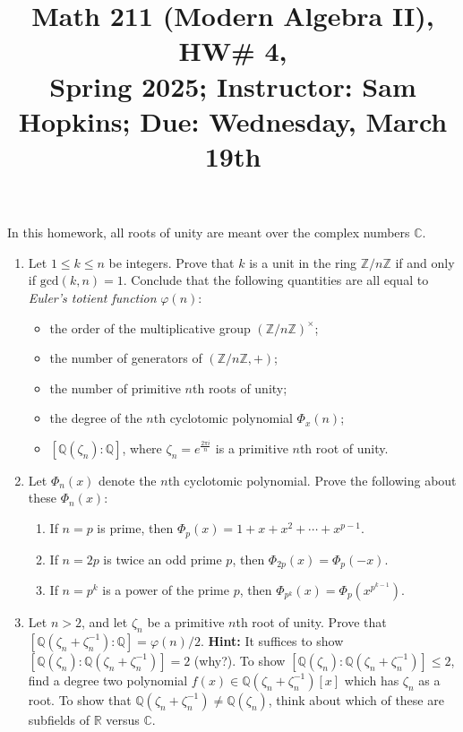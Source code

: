 \documentclass[11pt]{article}
\title{Math 211 (Modern Algebra II), HW\# 4, \\ {\normalsize Spring 2025; Instructor: Sam Hopkins; Due: Wednesday, March 19th}}
\date{}
\begin{document}
\maketitle

\thispagestyle{empty}

In this homework, all roots of unity are meant over the complex numbers $\mathbb{C}$.

\begin{enumerate}

\item Let $1 \leq k \leq n$ be integers. Prove that $k$ is a unit in the ring $\mathbb{Z}/n\mathbb{Z}$ if and only if $\mathrm{gcd}(k,n)=1$. Conclude that the following quantities are all equal to \emph{Euler's totient function} $\varphi(n)$:
\begin{itemize}
\item the order of the multiplicative group $(\mathbb{Z}/n\mathbb{Z})^{\times}$;
\item the number of generators of $(\mathbb{Z}/n\mathbb{Z},+)$;
\item the number of primitive $n$th roots of unity;
\item the degree of the $n$th cyclotomic polynomial $\Phi_x(n)$;
\item $[\mathbb{Q}(\zeta_n)\colon\mathbb{Q}]$, where $\zeta_n=e^{\frac{2\pi i}{n}}$ is a primitive $n$th root of unity.
\end{itemize}

\item Let $\Phi_n(x)$ denote the $n$th cyclotomic polynomial. Prove the following about these $\Phi_n(x)$:
\begin{enumerate}
\item If $n=p$ is prime, then $\Phi_p(x) = 1+x+x^2+\cdots+x^{p-1}$.
\item If $n=2p$ is twice an odd prime $p$, then $\Phi_{2p}(x) = \Phi_p(-x)$.
\item If $n=p^k$ is a power of the prime $p$, then $\Phi_{p^k}(x) = \Phi_{p}(x^{p^{k-1}})$.
\end{enumerate}

\item Let $n > 2$, and let $\zeta_n$ be a primitive $n$th root of unity. Prove that $[\mathbb{Q}(\zeta_n+\zeta_n^{-1}):\mathbb{Q}] = \varphi(n)/2$. {\bf Hint:} It suffices to show $[\mathbb{Q}(\zeta_n):\mathbb{Q}(\zeta_n+\zeta_n^{-1})]=2$ (why?). To show $[\mathbb{Q}(\zeta_n):\mathbb{Q}(\zeta_n+\zeta_n^{-1})] \leq 2$, find a degree two polynomial $f(x) \in \mathbb{Q}(\zeta_n+\zeta_n^{-1})[x]$ which has $\zeta_n$ as a root. To show that $\mathbb{Q}(\zeta_n+\zeta_n^{-1}) \neq \mathbb{Q}(\zeta_n)$, think about which of these are subfields of $\mathbb{R}$ versus $\mathbb{C}$.


\end{enumerate}
\end{document}
